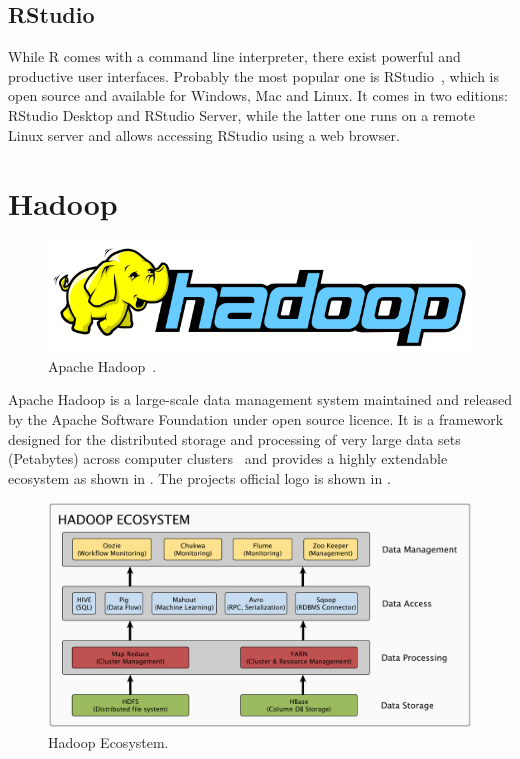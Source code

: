 \subsection{RStudio}
While R comes with a command line interpreter, there exist powerful and productive user interfaces. Probably the most popular one is RStudio~\cite{RStudio}, which is open source and available for Windows, Mac and Linux. It comes in two editions: RStudio Desktop and RStudio Server, while the latter one runs on a remote Linux server and allows accessing RStudio using a web browser.

\section{Hadoop}
\begin{figure}[ht]
\centering
\includegraphics[width=0.50\linewidth]{content/images/Hadoop_logo}
\caption{Apache Hadoop~\cite{HADOOP}.}
\label{fig:hadoopLogo}
\end{figure}
Apache Hadoop is a large-scale data management system maintained and released by the Apache Software Foundation under open source licence. It is a framework designed for the distributed storage and processing of very large data sets (Petabytes) across computer clusters~\cite{HADOOP} and provides a highly extendable ecosystem as shown in . The projects official logo is shown in .

\begin{figure}[ht]
\centering
\includegraphics[width=0.70\linewidth]{content/drawings/hadoopEcosystem}

\caption{Hadoop Ecosystem.}
\label{fig:ecosystem}
\end{figure}

